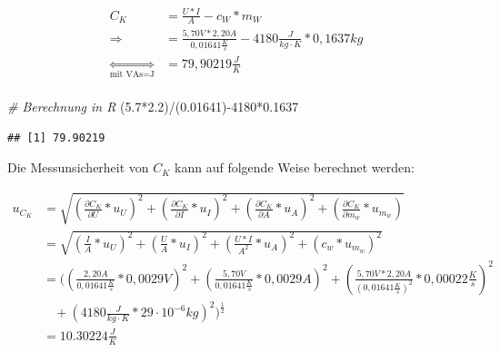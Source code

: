 \documentclass[class=article, crop=false]{standalone}
\newenvironment{Shaded}{\begin{snugshade}}{\end{snugshade}}
\newcommand{\CommentTok}[1]{\textcolor[rgb]{0.56,0.35,0.01}{\textit{#1}}}
\newcommand{\DecValTok}[1]{\textcolor[rgb]{0.00,0.00,0.81}{#1}}
\newcommand{\FloatTok}[1]{\textcolor[rgb]{0.00,0.00,0.81}{#1}}
\newcommand{\NormalTok}[1]{#1}
\newcommand{\SpecialCharTok}[1]{\textcolor[rgb]{0.00,0.00,0.00}{#1}}
\begin{document}
\begin{equation*}
\begin{split}
C_K &= \frac{U*I}{A}-c_W*m_W\\
\Rightarrow &=\frac{5,70V*2,20A}{0,01641\frac{K}{s}}-4180\frac{J}{kg\cdot K}*0,1637kg\\
\underset{\text{mit VAs=J}}{\Leftrightarrow} &= 79,90219\frac{J}{K}\\
\end{split}
\end{equation*}

\begin{Shaded}
\begin{Highlighting}[]
\CommentTok{\# Berechnung in R}
\NormalTok{(}\FloatTok{5.7}\SpecialCharTok{*}\FloatTok{2.2}\NormalTok{)}\SpecialCharTok{/}\NormalTok{(}\FloatTok{0.01641}\NormalTok{)}\SpecialCharTok{{-}}\DecValTok{4180}\SpecialCharTok{*}\FloatTok{0.1637}
\end{Highlighting}
\end{Shaded}

\begin{verbatim}
## [1] 79.90219
\end{verbatim}

Die Messunsicherheit von \(C_K\) kann auf folgende Weise berechnet
werden:

\begin{equation*}
\begin{split}
u_{C_K} &= \sqrt{(\frac{\partial C_K}{\partial U}*u_U)^2+(\frac{\partial C_K}{\partial I}*u_I)^2+(\frac{\partial C_K}{\partial A}*u_A)^2+(\frac{\partial C_K}{\partial m_w}*u_{m_w})}\\
&=\sqrt{(\frac{I}{A}*u_U)^2+(\frac{U}{A}*u_I)^2+(\frac{U*I}{A^2}*u_A)^2+(c_w*u_{m_w})^2}\\
&= ((\frac{2,20A}{0,01641\frac{K}{s}}*0,0029V)^2+(\frac{5,70V}{0,01641\frac{K}{s}}*0,0029A)^2+(\frac{5,70V*2,20A}{(0,01641\frac{K}{s})^2}*0,00022\frac{K}{s})^2\\
&\ \ \ \ +(4180\frac{J}{kg\cdot K}*29\cdot 10^{-6}kg)^2)^{\frac{1}{2}}\\
&= 10.30224 \frac{J}{K}
\end{split}
\end{equation*}
\end{document}

